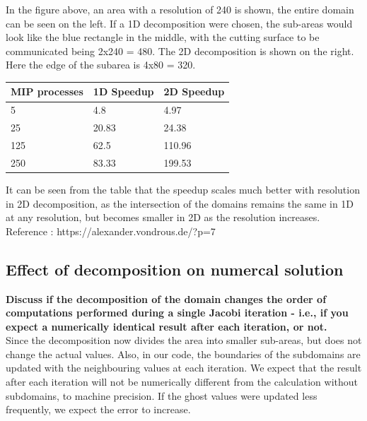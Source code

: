 \documentclass[10pt,a4paper]{article}
\begin{document}
In the figure above, an area with a resolution of 240 is shown, the entire domain can be seen on the left. If a 1D 
decomposition were chosen, the sub-areas would look like the blue rectangle in the middle, with the cutting surface 
to be communicated being 2x240 = 480. The 2D decomposition is shown on the right. Here the edge of the subarea is 
4x80 = 320. \\

\begin{table}[h]
    \centering
    \begin{tabular}{l|l|l}
    \textbf{MIP processes} & \textbf{1D Speedup} & \textbf{2D Speedup} \\ \hline
    5                      & 4.8             & 4.97            \\ \hline
    25                     & 20.83           & 24.38           \\ \hline
    125                    & 62.5            & 110.96          \\ \hline
    250                    & 83.33           & 199.53          \\
    \end{tabular}
\end{table}

It can be seen from the table that the speedup scales much better with resolution in 2D decomposition, as the 
intersection of the domains remains the same in 1D at any resolution, but becomes smaller in 2D as the resolution 
increases. \\

Reference : https://alexander.vondrous.de/?p=7

\newpage
\subsection{Effect of decomposition on numercal solution}

\textbf{Discuss if the decomposition of the domain changes the order of computations performed during a single Jacobi 
iteration -  i.e., if you expect a numerically identical result after each iteration, or not.} \\

Since the decomposition now divides the area into smaller sub-areas, but does not change the actual values. Also, 
in our code, the boundaries of the subdomains are updated with the neighbouring values at each iteration. We expect 
that the result after each iteration will not be numerically different from the calculation without subdomains, to 
machine precision. If the ghost values were updated less frequently, we expect the error to increase. \\
\end{document}
